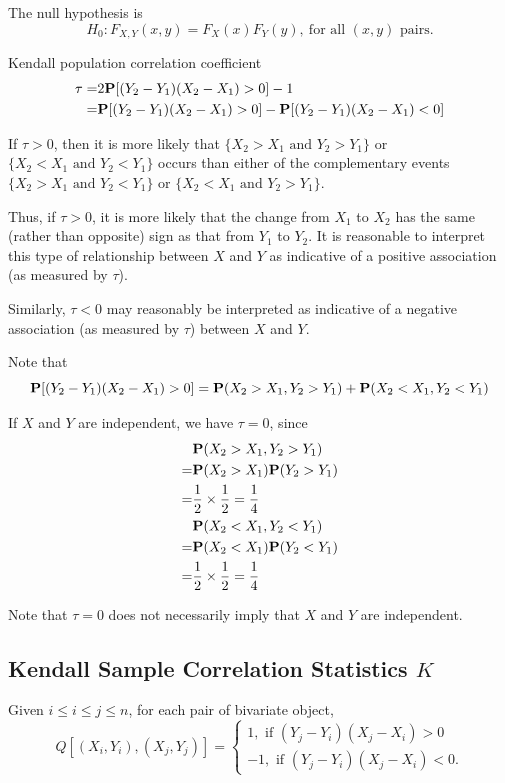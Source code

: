 The null hypothesis is
\[H_0: F_{X, Y}(x, y) = F_X(x)F_Y(y), ~\text{for all $(x, y)$ pairs.}\]

Kendall population correlation coefficient 
\begin{align*}
	\tau
	=& 2\P[(Y_2 - Y_1)(X_2 - X_1) > 0] - 1\\
	=& \P [(Y_2 - Y_1)(X_2 - X_1) > 0] - \P[(Y_2 - Y_1)(X_2 - X_1) < 0]
\end{align*}

If $\tau > 0$, then it is more likely that $\{X_2 > X_1 \text{ and } Y_2 > Y_1\}$ or $\{X_2 < X_1 \text{ and } Y_2 < Y_1\}$ occurs than either of the complementary events $\{X_2 > X_1 \text{ and } Y_2 < Y_1\}$ or $\{X_2 < X_1 \text{ and } Y_2 > Y_1\}$.

Thus, if $\tau > 0$, it is more likely that the change from $X_1$ to $X_2$ has the same (rather than opposite) sign as that from $Y_1$ to $Y_2$. It is reasonable to interpret this type of relationship between $X$ and $Y$ as indicative of a positive association (as measured by $\tau$).

Similarly, $\tau < 0$ may reasonably be interpreted as indicative of a negative association (as measured by $\tau$) between $X$ and $Y$.

Note that 
\[\P[(Y_2 - Y_1)(X_2 - X_1) > 0] = \P(X_2 > X_1, Y_2 > Y_1) + \P(X_2 < X_1, Y_2 < Y_1)\]

If $X$ and $Y$ are independent, we have $\tau = 0$, since
\begin{align*}
	&\P(X_2 > X_1, Y_2 > Y_1) \\
	= &\P(X_2 > X_1) \P(Y_2 > Y_1)\\
	= & \frac{1}{2} \times \frac{1}{2} = \frac{1}{4}\\
	&\P(X_2 < X_1, Y_2 < Y_1) \\
	= &\P(X_2 < X_1) \P(Y_2 < Y_1)\\
	= & \frac{1}{2} \times \frac{1}{2} = \frac{1}{4}
\end{align*}

Note that $\tau = 0$ does not necessarily imply that $X$ and $Y$ are independent.

\subsection{Kendall Sample Correlation Statistics $K$}
Given $i \le i \le j \le n$, for each pair of bivariate object,
\[Q[(X_i, Y_i), (X_j, Y_j)] = 
\begin{cases}
	1, \text{ if } (Y_j - Y_i)(X_j - X_i) > 0\\
	-1, \text{ if } (Y_j - Y_i)(X_j - X_i) < 0.
\end{cases}\]

